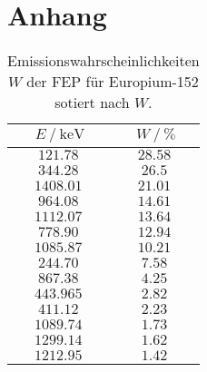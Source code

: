 \chapter*{Anhang}
\label{cha:Messdaten}


\begin{table}
    \centering
    \caption{Emissionswahrscheinlichkeiten $W$ der FEP für Europium-152 sotiert nach $W$. \cite{Gammaspektrum_Eu152}}
    \label{tab:eu152_FEP}
    \begin{tabular}{c c}
      \toprule
      $E \mathbin{/} \unit{\kilo\electronvolt}$ & $W \mathbin{/} \% $ \\
      \midrule
      $\qty{121.78}{} $ & $\qty{28.58}{}$ \\
      $\qty{344.28}{}$ & $\qty{26.5}{}$ \\
      $\qty{1408.01}{}$ & $\qty{21.01}{}$  \\
      $\qty{964.08}{}$ & $\qty{14.61}{}$  \\
      $\qty{1112.07}{}$ & $\qty{13.64}{}$\\
      $\qty{778.90}{}$ & $\qty{12.94}{}$  \\
      $\qty{1085.87}{}$ & $\qty{10.21}{}$ \\
      $\qty{244.70}{}$ & $\qty{7.58}{}$  \\
      $\qty{867.38}{}$ & $\qty{4.25}{}$  \\
      $\qty{443.965}{}$ & $\qty{2.82}{}$ \\
      $\qty{411.12}{}$ & $\qty{2.23}{}$  \\
      $\qty{1089.74}{}$ & $\qty{1.73}{}$ \\
      $\qty{1299.14}{}$ & $\qty{1.62}{}$ \\
      $\qty{1212.95}{}$ & $\qty{1.42}{}$ \\

      \bottomrule
    \end{tabular}
\end{table}